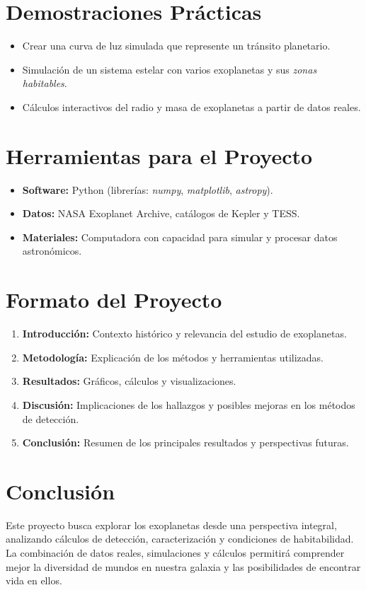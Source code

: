 \documentclass[12pt]{article}
\begin{document}
\section*{Demostraciones Pr\'acticas}
\begin{itemize}
    \item Crear una curva de luz simulada que represente un tr\'ansito planetario.
    \item Simulaci\'on de un sistema estelar con varios exoplanetas y sus \textit{zonas habitables}.
    \item C\'alculos interactivos del radio y masa de exoplanetas a partir de datos reales.
\end{itemize}

\section*{Herramientas para el Proyecto}
\begin{itemize}
    \item \textbf{Software:} Python (librer\'ias: \textit{numpy}, \textit{matplotlib}, \textit{astropy}).
    \item \textbf{Datos:} NASA Exoplanet Archive, cat\'alogos de Kepler y TESS.
    \item \textbf{Materiales:} Computadora con capacidad para simular y procesar datos astron\'omicos.
\end{itemize}

\section*{Formato del Proyecto}
\begin{enumerate}
    \item \textbf{Introducci\'on:} Contexto hist\'orico y relevancia del estudio de exoplanetas.
    \item \textbf{Metodolog\'ia:} Explicaci\'on de los m\'etodos y herramientas utilizadas.
    \item \textbf{Resultados:} Gr\'aficos, c\'alculos y visualizaciones.
    \item \textbf{Discusi\'on:} Implicaciones de los hallazgos y posibles mejoras en los m\'etodos de detecci\'on.
    \item \textbf{Conclusi\'on:} Resumen de los principales resultados y perspectivas futuras.
\end{enumerate}

\section*{Conclusi\'on}
Este proyecto busca explorar los exoplanetas desde una perspectiva integral, analizando c\'alculos de detecci\'on, caracterizaci\'on y condiciones de habitabilidad. La combinaci\'on de datos reales, simulaciones y c\'alculos permitir\'a comprender mejor la diversidad de mundos en nuestra galaxia y las posibilidades de encontrar vida en ellos.
\end{document}
